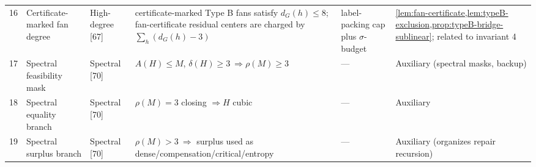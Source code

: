\documentclass[11pt]{article}
\begin{document}
{\begin{longtable}{C{0.022\textwidth} L{0.135\textwidth} L{0.115\textwidth} L{0.235\textwidth} L{0.085\textwidth} L{0.29\textwidth}}
16 & Certificate-marked fan degree & High-degree {[67]} & certificate-marked Type B fans satisfy $d_G(h)\le8$; fan-certificate residual centers are charged by $\sum_h(d_G(h)-3)$ & label-packing cap plus $\sigma$-budget & \cref{lem:fan-certificate,lem:typeB-exclusion,prop:typeB-bridge-sublinear}; related to invariant 4 \\
17 & Spectral feasibility mask & Spectral {[70]} & $A(H)\le M$, $\delta(H)\ge3\ \Rightarrow\rho(M)\ge3$ & --- & Auxiliary (spectral masks, backup) \\
18 & Spectral equality branch & Spectral {[70]} & $\rho(M)=3$ closing $\Rightarrow H$ cubic & --- & Auxiliary \\
19 & Spectral surplus branch & Spectral {[70]} & $\rho(M)>3\ \Rightarrow$ surplus used as dense/compensation/critical/entropy & --- & Auxiliary (organizes repair recursion) \\
\bottomrule
\end{longtable}
}
\end{document}
